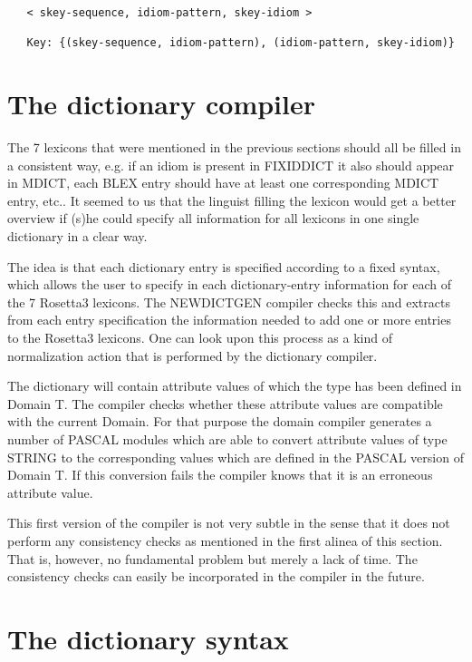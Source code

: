 \begin{verbatim}
   < skey-sequence, idiom-pattern, skey-idiom >

   Key: {(skey-sequence, idiom-pattern), (idiom-pattern, skey-idiom)}

\end{verbatim}

\section {The dictionary compiler}

The 7 lexicons that were mentioned in the previous sections should all be 
filled in a consistent way, e.g. if an idiom is present in FIXIDDICT it also
should appear in MDICT, each BLEX entry should have at least one corresponding
MDICT entry, etc.. It seemed to us that the linguist  filling the lexicon would 
get a better overview if (s)he could specify all information for 
all lexicons in one single dictionary in a clear way. 

The idea is that each dictionary entry is specified according to a fixed syntax,
which allows the user to specify in each dictionary-entry information for each 
of the 7 Rosetta3 lexicons.
The NEWDICTGEN compiler checks this and extracts from each entry specification 
the information needed to add one or more entries to the Rosetta3 lexicons.
One can look upon this process as a kind of normalization action that is 
performed by the dictionary compiler.

The dictionary will contain attribute values of which the type has been defined
in Domain T. The compiler checks whether these attribute values
are compatible with the current Domain. For that purpose the domain compiler
generates a number of PASCAL modules which are able to convert attribute
values of type STRING to the corresponding values which are defined in the
PASCAL version of Domain T. If this conversion fails the compiler knows that
it is an erroneous attribute value. 

This first version of the compiler is not very subtle in the sense that it does 
not perform any consistency checks as mentioned in the first alinea of this 
section. That is, however, no fundamental problem but merely a lack of time. 
The consistency checks can easily be incorporated in the compiler in the 
future.

\section {The dictionary syntax}

